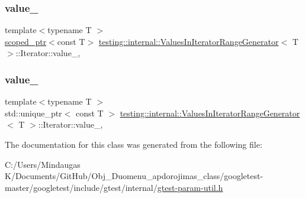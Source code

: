 \mbox{\label{classtesting_1_1internal_1_1_values_in_iterator_range_generator_1_1_iterator_a57e4f5d7ad1d15f38089513198c305f0}} 
\subsubsection{\texorpdfstring{value\_}{value\_}\hspace{0.1cm}{\footnotesize\ttfamily [1/2]}}
{\footnotesize\ttfamily template$<$typename T $>$ \\
\mbox{\hyperlink{classtesting_1_1internal_1_1scoped__ptr}{scoped\+\_\+ptr}}$<$const T$>$ \mbox{\hyperlink{classtesting_1_1internal_1_1_values_in_iterator_range_generator}{testing\+::internal\+::\+Values\+In\+Iterator\+Range\+Generator}}$<$ T $>$\+::Iterator\+::value\+\_\+\hspace{0.3cm}{\ttfamily [mutable]}, {\ttfamily [private]}}

\mbox{\label{classtesting_1_1internal_1_1_values_in_iterator_range_generator_1_1_iterator_ac173c404aa7250d32297e56750c784c1}} 
\subsubsection{\texorpdfstring{value\_}{value\_}\hspace{0.1cm}{\footnotesize\ttfamily [2/2]}}
{\footnotesize\ttfamily template$<$typename T $>$ \\
std\+::unique\+\_\+ptr$<$ const T $>$ \mbox{\hyperlink{classtesting_1_1internal_1_1_values_in_iterator_range_generator}{testing\+::internal\+::\+Values\+In\+Iterator\+Range\+Generator}}$<$ T $>$\+::Iterator\+::value\+\_\+\hspace{0.3cm}{\ttfamily [mutable]}, {\ttfamily [private]}}



The documentation for this class was generated from the following file\+:\begin{DoxyCompactItemize}
\item 
C\+:/\+Users/\+Mindaugas K/\+Documents/\+Git\+Hub/\+Obj\+\_\+\+Duomenu\+\_\+apdorojimas\+\_\+class/googletest-\/master/googletest/include/gtest/internal/\mbox{\hyperlink{googletest-master_2googletest_2include_2gtest_2internal_2gtest-param-util_8h}{gtest-\/param-\/util.\+h}}\end{DoxyCompactItemize}
